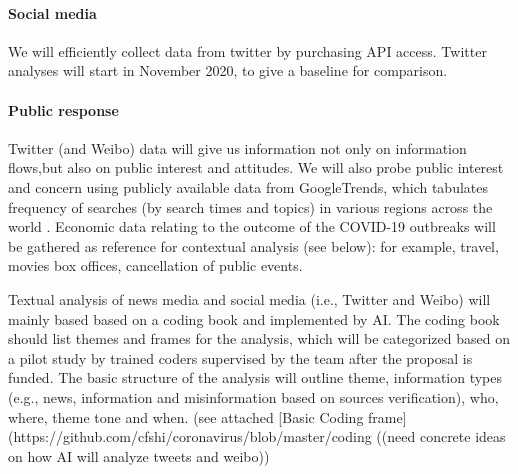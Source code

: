 \paragraph{Social media} 
We will efficiently collect data from twitter by purchasing API access. Twitter analyses will start in November 2020, to give a baseline for comparison.  

\paragraph{Public response}
Twitter (and Weibo) data will give us information not only on information flows,but also on public interest and attitudes. We will also probe public interest and concern using publicly available data from GoogleTrends, which tabulates frequency of searches (by search times and topics) in various regions across the world \cite{BousAgac17, MahrBrag19}.
Economic data relating to the outcome of the COVID-19 outbreaks will be gathered as reference for contextual analysis (see below): for example, travel, movies box offices, cancellation of public events.





Textual analysis of news media and social media (i.e., Twitter and Weibo) will mainly based based on a coding book and implemented by AI.  The coding book should list themes and frames for the analysis, which will be categorized based on a pilot study by trained coders supervised by the team after the proposal is funded.  The basic structure of the analysis will outline theme, information types  (e.g., news, information and misinformation based on sources verification), who, where, theme tone and when.  (see  attached [Basic Coding frame](https://github.com/cfshi/coronavirus/blob/master/coding%
((need concrete ideas on how AI will analyze tweets and weibo)) 


